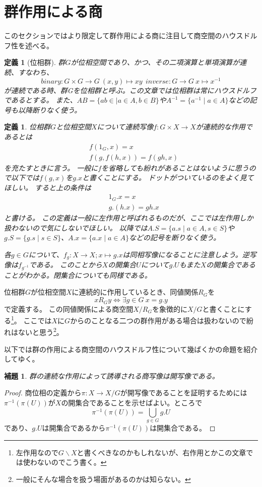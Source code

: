 \documentclass[leqno]{jsarticle}
\newtheorem{lem}[thm]{補題}
\newtheorem{df}[thm]{定義}
\begin{document}
\section{群作用による商}
このセクションではより限定して群作用による商に注目して商空間のハウスドルフ性を述べる。
\begin{df}[位相群]
群$G$が位相空間であり、かつ、その二項演算と単項演算が連続、すなわち、
\[
binary:G\times G\rightarrow G\ (x,y)\mapsto xy\ \ inverse:G\rightarrow G\ x\mapsto x^{-1}
\]が連続である時、群Gを位相群と呼ぶ。この文章では位相群は常にハウスドルフであるとする。
また、$AB=\{ab\in \mid a\in A,b\in B\}$や$A^{-1}=\{a^{-1}\mid a\in A\}$などの記号も以降断りなく使う。
\end{df}
\begin{df}
位相群$G$と位相空間$X$について連続写像$f:G\times X\to X$が連続的な作用であるとは
\setcounter{equation}{0}
\begin{align}
&f(1_G,x)=x\\
&f(g,f(h,x))=f(gh,x)
\end{align}
を充たすときに言う。
一般に$f$を省略しても紛れがあることはないように思うので以下では$f(g,x)$を$g.x$と書くことにする。
ドットがついているのをよく見てほしい。
すると上の条件は
\setcounter{equation}{0}
\begin{align}
&1_G.x=x\\
&g.(h.x)=gh.x
\end{align}
と書ける。
この定義は一般に左作用と呼ばれるものだが、ここでは左作用しか扱わないので気にしないでほしい。
以降では$A.S=\{a.s\mid a\in A, s\in S\}$や$g.S=\{g.s\mid s\in S\}$、$A.x=\{a.x\mid a\in A\}$などの記号を断りなく使う。
\par
各$g\in G$について、$f_g:X\to X; x\mapsto g.x$は同相写像になることに注意しよう。逆写像は$f_{g^{-1}}$である。
このことから$X$の開集合$U$について$g.U$もまた$X$の開集合であることがわかる。閉集合についても同様である。
\end{df}
位相群$G$が位相空間$X$に連続的に作用しているとき、同値関係$R_G$を
\[
xR_Gy\iff \exists g\in G\ x=g.y
\]
で定義する。
この同値関係による商空間$X/R_G$を象徴的に$X/G$と書くことにする\footnote{左作用なので$G\backslash X$と書くべきなのかもしれないが、右作用とかこの文章では使わないのでこう書く。}。
ここでは$X$に$G$からのことなる二つの群作用がある場合は扱わないので紛れはないと思う\footnote{一般にそんな場合を扱う場面があるのかは知らない。}。

以下では群の作用による商空間のハウスドルフ性について幾ばくかの命題を紹介してゆく。

\begin{lem}
群の連続な作用によって誘導される商写像は開写像である。
\end{lem}
\begin{proof}
商位相の定義から$\pi:X\to X/G$が開写像であることを証明するためには$\pi^{-1}(\pi(U))$が$X$の開集合であることを示せばよい。ところで
\[
\pi^{-1}(\pi(U))=\bigcup_{g\in G}g.U
\]
であり、$g.U$は開集合であるから$\pi^{-1}(\pi(U))$は開集合である。
\end{proof}
\end{document}

